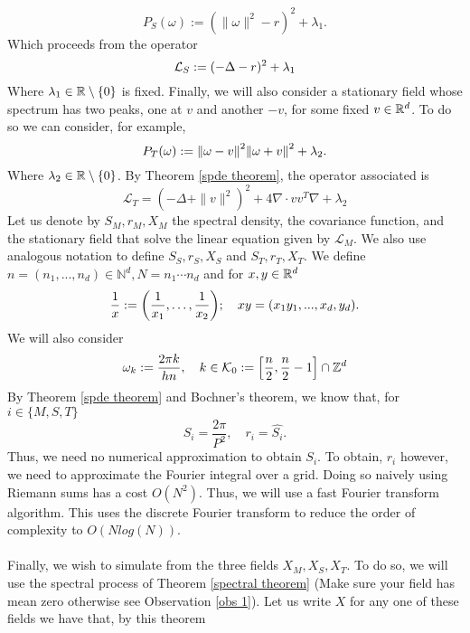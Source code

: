 \documentclass[12pt]{article}
\newcommand{\red}[1]{{\color{red}#1}}
\begin{document}
\begin{equation*}
    P_S(\omega):=(\|\omega\|^2-r)^2+\lambda_1.
\end{equation*}
Which proceeds from the operator
\begin{equation}
    \mathcal{L}_S:=(-\Delta-r)^2+\lambda_1
\end{equation}
Where $\lambda_1\in{\mathbb R}\setminus\{0\}$ is fixed. Finally, we will also consider a stationary field whose spectrum has two peaks, one  at $v$ and another $-v$,  for some fixed $v\in{\mathbb R}^d$. To do so we can consider, for example,
\begin{equation*}
    P_T(\omega):=\norm{\omega-v}^2\norm{\omega+v}^2+\lambda_2.
\end{equation*}
Where $\lambda_2\in{\mathbb R}\setminus\{0\}$.
By Theorem \ref{spde theorem}, the operator associated is
\begin{equation}\label{two peaks}
    \mathcal{L}_T=(-\Delta+\|v\|^2)^2+4\nabla\cdot vv^T\nabla+\lambda_2
\end{equation}
Let us denote by $S_M,r_M,X_M$ the spectral density, the covariance function, and the stationary field that solve the linear equation given by $\mathcal{L}_M$. We also use analogous notation to define $S_S,r_S,X_S$ and $S_T,r_T,X_T$. We define $n=(n_1,...,n_d)\in\mathbb{N}^d, N=n_1\cdots n_d$ and for $x,y\in{\mathbb R}^d$
\begin{equation*}
    \frac{1}{x}:=\qty(\frac{1}{x_1},\ldots,\frac{1}{x_2});\quad xy=(x_1y_1,...,x_d,y_d).
\end{equation*}
We will also consider
\begin{equation}\label{omk}
    \omega_k:=\frac{2\pi k}{hn},\quad k\in \mathcal{K}_0:=\qty[\frac{n}{2},\frac{n}{2}-1]\cap {\mathbb Z}^d
\end{equation}
By Theorem \ref{spde theorem} and Bochner's theorem, we know that, for $i\in \{M,S,T\}$
\begin{equation*}
    S_i=\frac{2\pi}{P^2},\quad r_i=\hat{S_i}.
\end{equation*}
Thus, we need no numerical approximation to obtain $S_i$. To obtain, $r_i$ however, we need to approximate the Fourier integral over a grid. Doing so naively using Riemann sums has a cost $O(N^2)$. Thus, we will use a fast Fourier transform algorithm. This uses the discrete Fourier transform to reduce the order of complexity to $O(Nlog(N))$.\\
\\
Finally, we wish to simulate from the three fields $X_M,X_S,X_T$. To do so, we will use the spectral process of Theorem \ref{spectral theorem} (\red{Make sure your field has mean zero otherwise see Observation \ref{obs 1}}). Let us write $X$ for any one of these fields we have that, by this theorem
\end{document}

